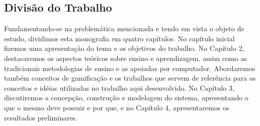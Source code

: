 \subsection{Divisão do Trabalho}

Fundamentando-se na problemática mencionada e tendo em vista o objeto de estudo, dividimos esta monografia em quatro capítulos. No capítulo inicial fizemos uma apresentação do tema e os objetivos do 
trabalho. No Capítulo 2, destacaremos os aspectos teóricos sobre ensino e aprendizagem, assim como as tradicionais metodologias de ensino e as apoiadas por computador. Abordaremos tamb\'em conceitos 
de gamificação e os trabalhos que servem de refer\^encia para os conceitos e id\'eias utilizadas no trabalho aqui desenvolvido. No Capítulo 3, discutiremos a concepção, construção e modelagem do 
sistema, apresentando o que o mesmo deve possuir e por que, e no Capítulo 4, apresentaremos os resultados preliminares.